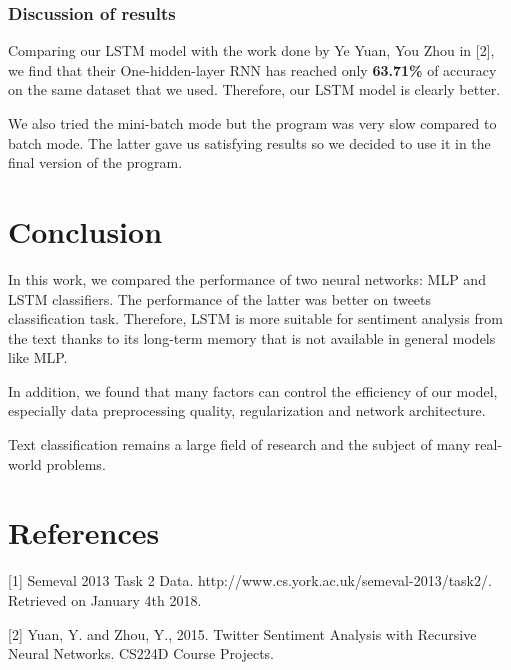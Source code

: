 \documentclass[a4paper,english,12pt]{article}
\begin{document}
\subsubsection{Discussion of results}
Comparing our LSTM model with the work done by Ye Yuan, You Zhou in [2], we find that their One-hidden-layer RNN has reached only \textbf{63.71\%} of accuracy on the same dataset that we used. Therefore, our LSTM model is clearly better.

We also tried the mini-batch mode but the program was very slow compared to batch mode. The latter gave us satisfying results so we decided to use it in the final version of the program.

\section{Conclusion}
In this work, we compared the performance of two neural networks: MLP and LSTM classifiers. The performance of the latter was better on tweets classification task. Therefore, LSTM is more suitable for sentiment analysis from the text thanks to its long-term memory that is not available in general models like MLP.

In addition, we found that many factors can control the efficiency of our model, especially data preprocessing quality, regularization and network architecture.

Text classification remains a large field of research and the subject of many real-world problems.

\section{References}
[1] Semeval 2013 Task 2 Data. http://www.cs.york.ac.uk/semeval-2013/task2/. Retrieved on January 4th 2018.

[2] Yuan, Y. and Zhou, Y., 2015. Twitter Sentiment Analysis with Recursive Neural Networks. CS224D Course Projects.
\end{document}
